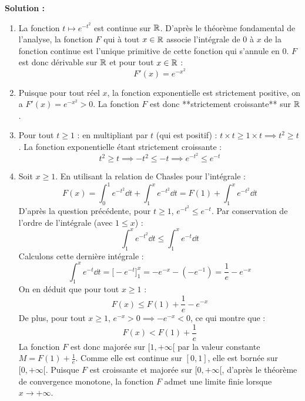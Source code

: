 \textbf{Solution :}
\begin{enumerate}
    \item La fonction $t \mapsto e^{-t^2}$ est continue sur $\mathbb{R}$.
    D'après le théorème fondamental de l'analyse, la fonction $F$ qui à tout $x \in \mathbb{R}$ associe l'intégrale de $0$ à $x$ de la fonction continue est l'unique primitive de cette fonction qui s'annule en 0.
    $F$ est donc dérivable sur $\mathbb{R}$ et pour tout $x \in \mathbb{R}$ :
    \[
    F'(x) = e^{-x^2}
    \]
    
    \item Puisque pour tout réel $x$, la fonction exponentielle est strictement positive, on a $F'(x) = e^{-x^2} > 0$.
    La fonction $F$ est donc **strictement croissante** sur $\mathbb{R}$.
    
    \item Pour tout $t \ge 1$ : en multipliant par $t$ (qui est positif) : $t \times t \ge 1 \times t \implies t^2 \ge t$.
    La fonction exponentielle étant strictement croissante :
    \[
    t^2 \ge t \implies -t^2 \le -t \implies e^{-t^2} \le e^{-t}
    \]
    
    \item Soit $x \ge 1$. En utilisant la relation de Chasles pour l'intégrale :
    \[
    F(x) = \int_0^1 e^{-t^2} \dd t + \int_1^x e^{-t^2} \dd t = F(1) + \int_1^x e^{-t^2} \dd t
    \]
    D'après la question précédente, pour $t \ge 1$, $e^{-t^2} \le e^{-t}$. Par conservation de l'ordre de l'intégrale (avec $1 \le x$) :
    \[
    \int_1^x e^{-t^2} \dd t \le \int_1^x e^{-t} \dd t
    \]
    Calculons cette dernière intégrale :
    \[
    \int_1^x e^{-t} \dd t = \Big[ -e^{-t} \Big]_1^x = -e^{-x} - (-e^{-1}) = \frac{1}{e} - e^{-x}
    \]
    On en déduit que pour tout $x \ge 1$ :
    \[
    F(x) \le F(1) + \frac{1}{e} - e^{-x}
    \]
    De plus, pour tout $x \ge 1$, $e^{-x} > 0 \implies -e^{-x} < 0$, ce qui montre que :
    \[
    F(x) < F(1) + \frac{1}{e}
    \]
    La fonction $F$ est donc majorée sur $[1, +\infty[$ par la valeur constante $M = F(1) + \frac{1}{e}$. Comme elle est continue sur $[0,1]$, elle est bornée sur $[0, +\infty[$.
    Puisque $F$ est croissante et majorée sur $[0, +\infty[$, d'après le théorème de convergence monotone, la fonction $F$ admet une limite finie lorsque $x \to +\infty$.
\end{enumerate}

